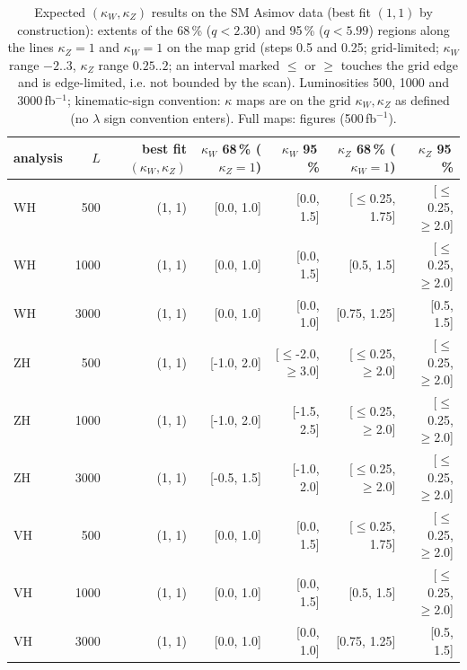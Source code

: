 \begin{table}[ht]\centering\small
\begin{tabular}{lrrrrrr}\hline
analysis & $L$ & best fit $(\kappa_W,\kappa_Z)$ & $\kappa_W$ 68\,\% ($\kappa_Z{=}1$) & $\kappa_W$ 95\,\% & $\kappa_Z$ 68\,\% ($\kappa_W{=}1$) & $\kappa_Z$ 95\,\% \\\hline
WH & 500 & (1, 1) & [0.0, 1.0] & [0.0, 1.5] & [$\le$0.25, 1.75] & [$\le$0.25, $\ge$2.0] \\
WH & 1000 & (1, 1) & [0.0, 1.0] & [0.0, 1.5] & [0.5, 1.5] & [$\le$0.25, $\ge$2.0] \\
WH & 3000 & (1, 1) & [0.0, 1.0] & [0.0, 1.0] & [0.75, 1.25] & [0.5, 1.5] \\
ZH & 500 & (1, 1) & [-1.0, 2.0] & [$\le$-2.0, $\ge$3.0] & [$\le$0.25, $\ge$2.0] & [$\le$0.25, $\ge$2.0] \\
ZH & 1000 & (1, 1) & [-1.0, 2.0] & [-1.5, 2.5] & [$\le$0.25, $\ge$2.0] & [$\le$0.25, $\ge$2.0] \\
ZH & 3000 & (1, 1) & [-0.5, 1.5] & [-1.0, 2.0] & [$\le$0.25, $\ge$2.0] & [$\le$0.25, $\ge$2.0] \\
VH & 500 & (1, 1) & [0.0, 1.0] & [0.0, 1.5] & [$\le$0.25, 1.75] & [$\le$0.25, $\ge$2.0] \\
VH & 1000 & (1, 1) & [0.0, 1.0] & [0.0, 1.5] & [0.5, 1.5] & [$\le$0.25, $\ge$2.0] \\
VH & 3000 & (1, 1) & [0.0, 1.0] & [0.0, 1.0] & [0.75, 1.25] & [0.5, 1.5] \\\hline
\end{tabular}
\caption{Expected $(\kappa_W,\kappa_Z)$ results on the SM Asimov data (best fit $(1,1)$ by construction): extents of the 68\,\% ($q<2.30$) and 95\,\% ($q<5.99$) regions along the lines $\kappa_Z=1$ and $\kappa_W=1$ on the map grid (steps 0.5 and 0.25; grid-limited; $\kappa_W$ range $-2..3$, $\kappa_Z$ range $0.25..2$; an interval marked $\le$ or $\ge$ touches the grid edge and is edge-limited, i.e. not bounded by the scan). Luminosities 500, 1000 and 3000\,fb$^{-1}$; kinematic-sign convention: $\kappa$ maps are on the grid $\kappa_W,\kappa_Z$ as defined (no $\lambda$ sign convention enters). Full maps: figures (500\,fb$^{-1}$).}
\end{table}
